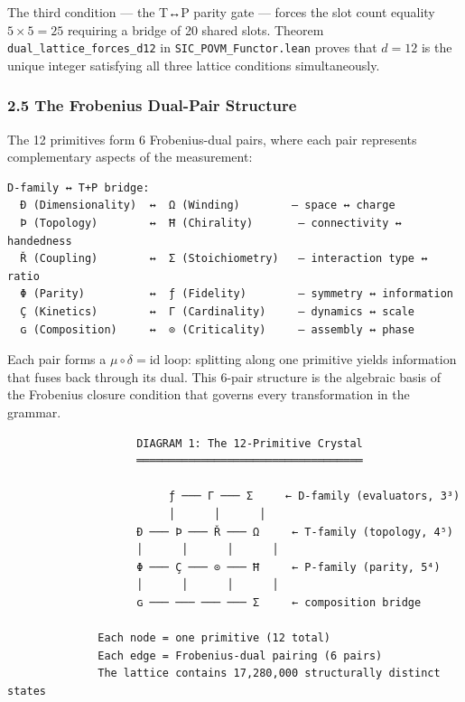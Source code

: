 \documentclass[12pt,a4paper]{article}
\begin{document}
The third condition --- the T↔P parity gate --- forces the slot count
equality \(5 \times 5 = 25\) requiring a bridge of 20 shared slots.
Theorem \texttt{dual\_lattice\_forces\_d12} in
\texttt{SIC\_POVM\_Functor.lean} proves that \(d=12\) is the unique
integer satisfying all three lattice conditions simultaneously.

\hypertarget{the-frobenius-dual-pair-structure}{%
\subsubsection{2.5 The Frobenius Dual-Pair
Structure}\label{the-frobenius-dual-pair-structure}}

The 12 primitives form 6 Frobenius-dual pairs, where each pair
represents complementary aspects of the measurement:

\begin{verbatim}
D-family ↔ T+P bridge:
  Ð (Dimensionality)  ↔  Ω (Winding)        — space ↔ charge
  Þ (Topology)        ↔  Ħ (Chirality)       — connectivity ↔ handedness
  Ř (Coupling)        ↔  Σ (Stoichiometry)   — interaction type ↔ ratio
  Φ (Parity)          ↔  ƒ (Fidelity)        — symmetry ↔ information
  Ç (Kinetics)        ↔  Γ (Cardinality)     — dynamics ↔ scale
  ɢ (Composition)     ↔  ⊙ (Criticality)     — assembly ↔ phase
\end{verbatim}

Each pair forms a \(\mu \circ \delta = \text{id}\) loop: splitting along
one primitive yields information that fuses back through its dual. This
6-pair structure is the algebraic basis of the Frobenius closure
condition that governs every transformation in the grammar.

\begin{verbatim}
                    DIAGRAM 1: The 12-Primitive Crystal
                    ═══════════════════════════════════

                         ƒ ─── Γ ─── Σ     ← D-family (evaluators, 3³)
                         │      │      │
                    Ð ─── Þ ─── Ř ─── Ω     ← T-family (topology, 4⁵)
                    │      │      │      │
                    Φ ─── Ç ─── ⊙ ─── Ħ     ← P-family (parity, 5⁴)
                    │      │      │      │
                    ɢ ─── ─── ─── ─── Σ     ← composition bridge

              Each node = one primitive (12 total)
              Each edge = Frobenius-dual pairing (6 pairs)
              The lattice contains 17,280,000 structurally distinct states
\end{verbatim}
\end{document}
